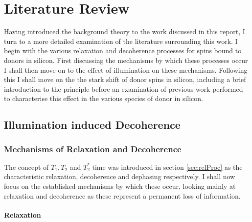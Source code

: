 
\chapter{Literature Review}
\label{chap:litRev}

Having introduced the background theory to the work discussed in this report, I turn to a more detailed examination of the literature surrounding this work.
I begin with the various relaxation and decoherence processes for spins bound to donors in silicon.
First discussing the mechanisms by which these processes occur I shall then move on to the effect of illumination on these mechanisms.
Following this I shall move on the the stark shift of donor spins in silicon, including a brief introduction to the principle before an examination of previous work performed to characterise this effect in the various species of donor in silicon.

\section{Illumination induced Decoherence}

\subsection{Mechanisms of Relaxation and Decoherence}

The concept of $T_1, T_2$ and $T_2^*$ time was introduced in section \ref{sec:relProc} as the characteristic relaxation, decoherence and dephasing respectively. 
I shall now focus on the established mechanisms by which these occur, looking mainly at relaxation and decoherence as these represent a permanent loss of information.

\subsubsection{Relaxation}

